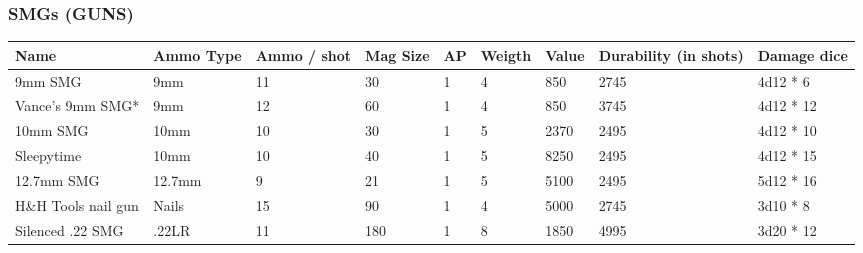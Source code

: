 
\subsubsection{SMGs (GUNS)}
\begin{longtable}{|p{3.2cm}|p{2.4cm}|p{1.3cm}|p{.9cm}|p{0.6cm}|p{1.3cm}|p{1cm}|p{2cm}|p{3.2cm}|}
\hline
\bfseries Name & \bfseries Ammo Type & \bfseries Ammo / shot & \bfseries Mag Size & \bfseries AP & \bfseries Weigth & \bfseries Value & \bfseries Durability (in shots) & \bfseries Damage dice \\
\hline
\endhead
9mm SMG & 9mm & 11 & 30 & 1 & 4 & 850 & 2745 & 4d12 * 6 \\
Vance's 9mm SMG* & 9mm & 12 & 60 & 1 & 4 & 850 & 3745 & 4d12 * 12 \\
10mm SMG & 10mm & 10 & 30 & 1 & 5 & 2370 & 2495 & 4d12 * 10 \\
Sleepytime & 10mm & 10 & 40 & 1 & 5 & 8250 & 2495 & 4d12 * 15 \\
12.7mm SMG & 12.7mm & 9 & 21 & 1 & 5 & 5100 & 2495 & 5d12 * 16 \\
H\&H Tools nail gun & Nails & 15 & 90 & 1 & 4 & 5000 & 2745 & 3d10 * 8 \\
Silenced .22 SMG & .22LR & 11 & 180 & 1 & 8 & 1850 & 4995 & 3d20 * 12 \\
\hline
\end{longtable}

